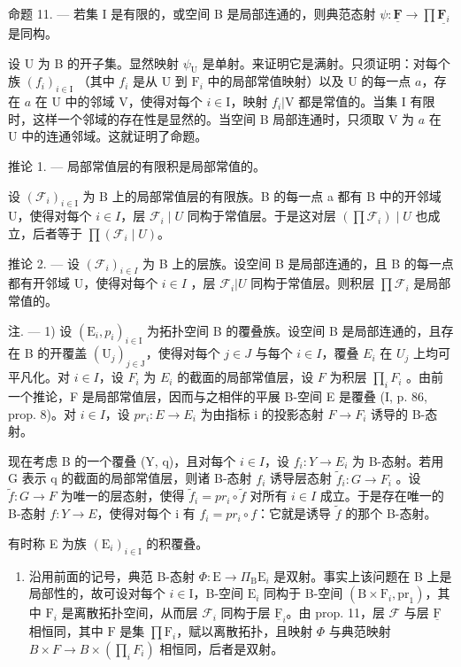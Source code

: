 命题 11. --- 若集 I 是有限的，或空间 B 是局部连通的，则典范态射 \(\psi\colon\underline{\mathbf{F}}\to\prod\underline{\mathbf{F}_{i}}\) 是同构。

设 U 为 B 的开子集。显然映射 \(\psi_{\mathrm{U}}\) 是单射。来证明它是满射。只须证明：对每个族 \((f_i)_{i\in \mathrm{I}}\) （其中 \(f_{i}\) 是从 U 到 \(\mathrm{F}_i\) 中的局部常值映射）以及 U 的每一点 \(a\)，存在 \(a\) 在 U 中的邻域 V，使得对每个 \(i\in \mathrm{I}\)，映射 \(f_{i}|\mathrm{V}\) 都是常值的。当集 I 有限时，这样一个邻域的存在性是显然的。当空间 B 局部连通时，只须取 V 为 \(a\) 在 U 中的连通邻域。这就证明了命题。

推论 1. --- 局部常值层的有限积是局部常值的。

设 \((\mathcal{F}_{i})_{i\in\mathrm{I}}\) 为 B 上的局部常值层的有限族。B 的每一点 a 都有 B 中的开邻域 U，使得对每个 \(i\in I\)，层 \(\mathcal{F}_{i}\mid U\) 同构于常值层。于是这对层 \((\prod\mathcal{F}_{i})\mid U\) 也成立，后者等于 \(\prod(\mathcal{F}_{i}\mid U)\)。

推论 2. --- 设 \((\mathcal{F}_{i})_{i\in I}\) 为 B 上的层族。设空间 B 是局部连通的，且 B 的每一点都有开邻域 U，使得对每个 \(i\in I\) ，层 \(\mathcal{F}_{i}|U\) 同构于常值层。则积层 \(\prod \mathcal{F}_{i}\) 是局部常值的。

注. --- 1) 设 \((\mathrm{E}_{i}, p_{i})_{i \in \mathrm{I}}\) 为拓扑空间 B 的覆叠族。设空间 B 是局部连通的，且存在 B 的开覆盖 \((\mathrm{U}_{j})_{j \in \mathrm{J}}\)，使得对每个 \(j \in J\) 与每个 \(i \in I\)，覆叠 \(E_{i}\) 在 \(U_{j}\) 上均可平凡化。对 \(i \in I\)，设 \(F_{i}\) 为 \(E_{i}\) 的截面的局部常值层，设 \(F\) 为积层 \(\prod_{i} F_{i}\) 。由前一个推论，F 是局部常值层，因而与之相伴的平展 B-空间 E 是覆叠 (I, p. 86, prop. 8)。对 \(i \in I\)，设 \(pr_{i}: E \to E_{i}\) 为由指标 i 的投影态射 \(F \to F_{i}\) 诱导的 B-态射。

现在考虑 B 的一个覆叠 (Y, q)，且对每个 \(i \in I\)，设 \(f_i \colon Y \to E_i\) 为 B-态射。若用 G 表示 q 的截面的局部常值层，则诸 B-态射 \(f_i\) 诱导层态射 \(\widetilde{f}_i \colon G \to F_i\) 。设 \(\widetilde{f} \colon G \to F\) 为唯一的层态射，使得 \(\widetilde{f}_i = pr_i \circ \widetilde{f}\) 对所有 \(i \in I\) 成立。于是存在唯一的 B-态射 \(f \colon Y \to E\)，使得对每个 i 有 \(f_i = pr_i \circ f\)：它就是诱导 \(\widetilde{f}\) 的那个 B-态射。

有时称 E 为族 \((\mathrm{E}_i)_{i\in \mathrm{I}}\) 的积覆叠。

\begin{enumerate}
\def\labelenumi{\arabic{enumi})}
\setcounter{enumi}{1}
\tightlist
\item
  沿用前面的记号，典范 B-态射 \(\Phi\colon\mathrm{E}\to\Pi_{\mathrm{B}}\mathrm{E}_{i}\) 是双射。事实上该问题在 B 上是局部性的，故可设对每个 \(i\in\mathrm{I}\)，B-空间 \(\mathrm{E}_{i}\) 同构于 B-空间 \((\mathrm{B}\times\mathrm{F}_{i},\mathrm{pr}_{1})\)，其中 \(\mathrm{F}_{i}\) 是离散拓扑空间，从而层 \(\mathcal{F}_{i}\) 同构于层 \(\underline{\mathrm{F}}_{i}\)。由 prop. 11，层 \(\mathcal{F}\) 与层 \(\underline{\mathrm{F}}\) 相恒同，其中 \(\mathrm{F}\) 是集 \(\prod\mathrm{F}_{i}\)，赋以离散拓扑，且映射 \(\Phi\) 与典范映射 \(B \times F \rightarrow B \times (\prod_{i} F_{i})\) 相恒同，后者是双射。
\end{enumerate}

